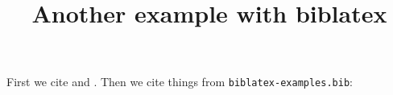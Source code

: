 \documentclass[biblatex]{iacrcc}
\title{Another example with biblatex}
\begin{document}
\maketitle
First we cite \cite{sample} and \cite{noemph}.
Then we cite things from \texttt{biblatex-examples.bib}: 
\cite{kowalik}
\cite{westfahl:space}
\cite{aksin}
\cite{angenendt}
\cite{baez/article}
\cite{bertram}
\cite{doody}
\cite{matuz:doody}
\cite{gillies}
\cite{glashow}
\cite{herrmann}
\cite{kastenholz}
\cite{murray}
\cite{reese}
\cite{sarfraz}
\cite{shore}
\cite{sigfridsson}
\cite{spiegelberg}
\cite{springer}
\cite{weinberg}
\cite{yoon}
\cite{augustine}
\cite{averroes/bland}
\cite{averroes/hannes}
\cite{averroes/hercz}
\cite{cicero}
\cite{coleridge}
\cite{companion}
\cite{cotton}
\cite{gerhardt}
\cite{gonzalez}
\cite{hammond}
\cite{iliad}
\cite{knuth:ct:a}
\cite{knuth:ct:b}
\cite{knuth:ct:c}
\cite{knuth:ct:d}
\cite{knuth:ct:e}
\cite{kullback}
\cite{kullback:reprint}
\cite{malinowski}
\cite{maron}
\cite{massa}
\cite{moore}
\cite{nietzsche:ksa}
\cite{nietzsche:ksa1}
\cite{nussbaum}
\cite{piccato}
\cite{vangennep}
\cite{vangennep:trans}
\cite{wilde}
\cite{worman}
\cite{britannica}
\cite{gaonkar}
\cite{gaonkar:in}
\cite{westfahl:frontier}
\cite{kant:kpv}
\cite{kant:ku}
\cite{nietzsche:historie}
\cite{brandt}
\cite{hyman}
\cite{pines}
\cite{salam}
\cite{cms}
\cite{baez/online}
\cite{ctan}
\cite{itzhaki}
\cite{markey}
\cite{wassenberg}
\cite{almendro}
\cite{kowalik}
\cite{laufenberg}
\cite{sorace}
\cite{jcg}
\cite{chiu}
\cite{padhye}
\cite{geer}
\cite{loh}

\printbibliography
\end{document}
